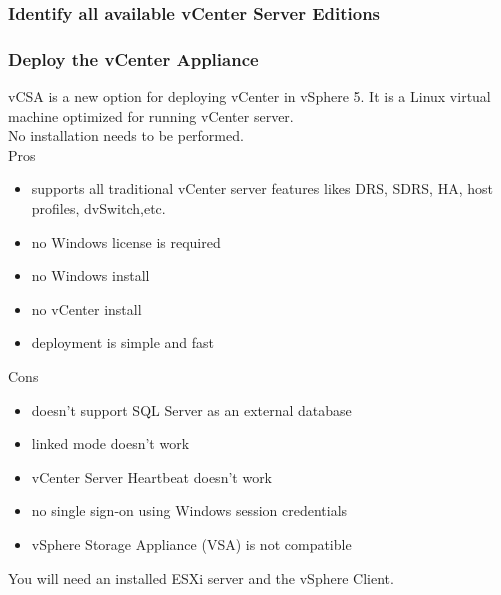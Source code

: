 \subsubsection{Identify all available vCenter Server Editions}

\subsubsection{Deploy the vCenter Appliance}

vCSA is a new option for deploying vCenter in vSphere 5. It is a Linux virtual
machine optimized for running vCenter server.\\

No installation needs to be performed.\\

Pros

\begin{itemize}
\item supports all traditional vCenter server features likes DRS, SDRS, HA,
host profiles, dvSwitch,etc.
\item no Windows license is required
\item no Windows install
\item no vCenter install
\item deployment is simple and fast
\end{itemize}

Cons

\begin{itemize}
\item doesn't support SQL Server as an external database
\item linked mode doesn't work
\item vCenter Server Heartbeat doesn't work
\item no single sign-on using Windows session credentials
\item vSphere Storage Appliance (VSA) is not compatible
\end{itemize}

You will need an installed ESXi server and the vSphere Client.

